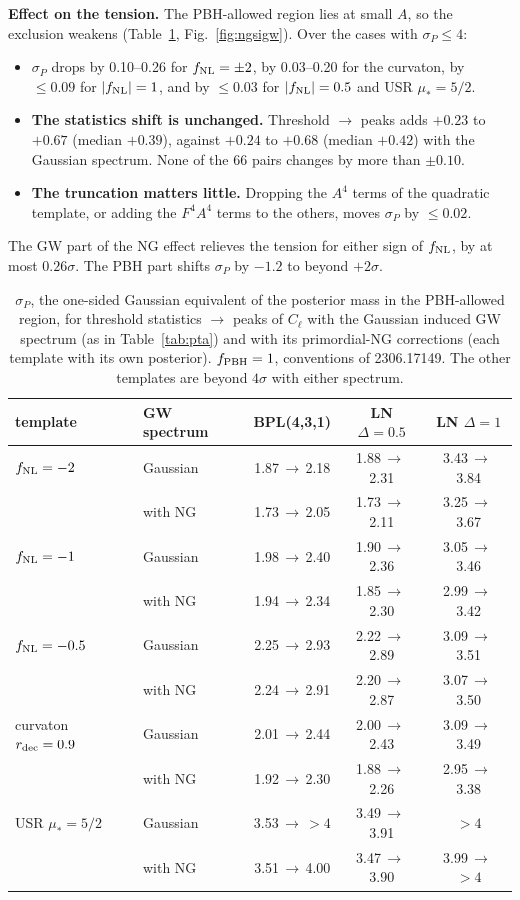 \documentclass[11pt,a4paper]{article}
\newcommand{\Cl}{C_{\ell}}
\newcommand{\fnl}{f_{\rm NL}}
\newcommand{\fpbh}{f_{\rm PBH}}
\begin{document}
\textbf{Effect on the tension.} The PBH-allowed region lies at small $A$, so the exclusion weakens
(Table~\ref{tab:ngsigw}, Fig.~\ref{fig:ngsigw}). Over the cases with $\sigma_P\le4$:
\begin{itemize}
\item $\sigma_P$ drops by 0.10--0.26 for $\fnl=\pm2$, by 0.03--0.20 for the curvaton, by
$\le0.09$ for $|\fnl|=1$, and by $\le0.03$ for $|\fnl|=0.5$ and USR $\mu_*=5/2$.
\item \textbf{The statistics shift is unchanged.} Threshold $\to$ peaks adds $+0.23$ to $+0.67$
(median $+0.39$), against $+0.24$ to $+0.68$ (median $+0.42$) with the Gaussian spectrum. None of
the 66 pairs changes by more than $\pm0.10$.
\item \textbf{The truncation matters little.} Dropping the $A^4$ terms of the quadratic template,
or adding the $F^4A^4$ terms to the others, moves $\sigma_P$ by $\le0.02$.
\end{itemize}
The GW part of the NG effect relieves the tension for either sign of $\fnl$, by at most
$0.26\sigma$. The PBH part shifts $\sigma_P$ by $-1.2$ to beyond $+2\sigma$.

\begin{table}[t]
\centering\small
\begin{tabular}{llccc}
\toprule
template & GW spectrum & BPL(4,3,1) & LN $\Delta=0.5$ & LN $\Delta=1$\\
\midrule
$\fnl=-2$ & Gaussian & 1.87\,$\to$\,2.18 & 1.88\,$\to$\,2.31 & 3.43\,$\to$\,3.84\\
 & with NG & 1.73\,$\to$\,2.05 & 1.73\,$\to$\,2.11 & 3.25\,$\to$\,3.67\\
$\fnl=-1$ & Gaussian & 1.98\,$\to$\,2.40 & 1.90\,$\to$\,2.36 & 3.05\,$\to$\,3.46\\
 & with NG & 1.94\,$\to$\,2.34 & 1.85\,$\to$\,2.30 & 2.99\,$\to$\,3.42\\
$\fnl=-0.5$ & Gaussian & 2.25\,$\to$\,2.93 & 2.22\,$\to$\,2.89 & 3.09\,$\to$\,3.51\\
 & with NG & 2.24\,$\to$\,2.91 & 2.20\,$\to$\,2.87 & 3.07\,$\to$\,3.50\\
curvaton $r_{\rm dec}=0.9$ & Gaussian & 2.01\,$\to$\,2.44 & 2.00\,$\to$\,2.43 & 3.09\,$\to$\,3.49\\
 & with NG & 1.92\,$\to$\,2.30 & 1.88\,$\to$\,2.26 & 2.95\,$\to$\,3.38\\
USR $\mu_*=5/2$ & Gaussian & 3.53\,$\to$\,$>4$ & 3.49\,$\to$\,3.91 & $>4$\\
 & with NG & 3.51\,$\to$\,4.00 & 3.47\,$\to$\,3.90 & 3.99\,$\to$\,$>4$\\
\bottomrule
\end{tabular}
\caption{$\sigma_P$, the one-sided Gaussian equivalent of the posterior mass in the PBH-allowed
region, for threshold statistics $\to$ peaks of $\Cl$ with the Gaussian induced GW spectrum (as in
Table~\ref{tab:pta}) and with its primordial-NG corrections (each template with
its own posterior). $\fpbh=1$, conventions of 2306.17149. The other templates are beyond
$4\sigma$ with either spectrum.}
\label{tab:ngsigw}
\end{table}
\end{document}

